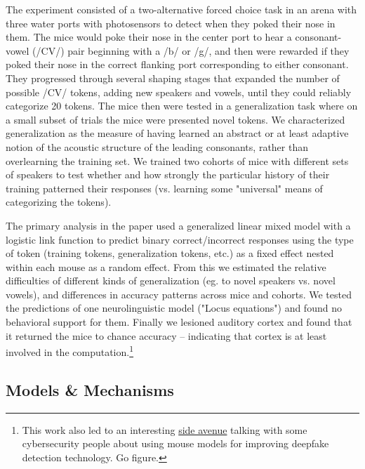 \begin{done}
The experiment consisted of a two-alternative forced choice task in an arena with three water ports with photosensors to detect when they poked their nose in them. The mice would poke their nose in the center port to hear a consonant-vowel (/CV/) pair beginning with a /b/ or /g/, and then were rewarded if they poked their nose in the correct flanking port corresponding to either consonant. They progressed through several shaping stages that expanded the number of possible /CV/ tokens, adding new speakers and vowels, until they could reliably categorize 20 tokens. The mice then were tested in a generalization task where on a small subset of trials the mice were presented novel tokens. We characterized generalization as the measure of having learned an abstract or at least adaptive notion of the acoustic structure of the leading consonants, rather than overlearning the training set. We trained two cohorts of mice with different sets of speakers to test whether and how strongly the particular history of their training patterned their responses (vs. learning some "universal" means of categorizing the tokens).

The primary analysis in the paper used a generalized linear mixed model with a logistic link function to predict binary correct/incorrect responses using the type of token (training tokens, generalization tokens, etc.) as a fixed effect nested within each mouse as a random effect. From this we estimated the relative difficulties of different kinds of generalization (eg. to novel speakers vs. novel vowels), and differences in accuracy patterns across mice and cohorts. We tested the predictions of one neurolinguistic model ("Locus equations") and found no behavioral support for them. Finally we lesioned auditory cortex and found that it returned the mice to chance accuracy -- indicating that cortex is at least involved in the computation.\footnote{This work also led to an interesting \href{https://www.blackhat.com/us-19/briefings/schedule/\#detecting-deep-fakes-with-mice-14467}{side avenue} talking with some cybersecurity people about using mouse models for improving deepfake detection technology. Go figure.}
\end{done}

\subsection{Models \& Mechanisms}

